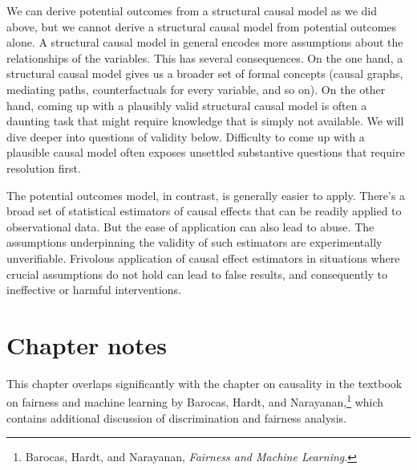 \documentclass{tufte-book}
\begin{document}
We can derive potential outcomes from a structural causal model as we
did above, but we cannot derive a structural causal model from potential
outcomes alone. A structural causal model in general encodes more
assumptions about the relationships of the variables. This has several
consequences. On the one hand, a structural causal model gives us a
broader set of formal concepts (causal graphs, mediating paths,
counterfactuals for every variable, and so on). On the other hand,
coming up with a plausibly valid structural causal model is often a
daunting task that might require knowledge that is simply not available.
We will dive deeper into questions of validity below. Difficulty to come
up with a plausible causal model often exposes unsettled substantive
questions that require resolution first.

The potential outcomes model, in contrast, is generally easier to apply.
There's a broad set of statistical estimators of causal effects that can
be readily applied to observational data. But the ease of application
can also lead to abuse. The assumptions underpinning the validity of
such estimators are experimentally unverifiable. Frivolous application
of causal effect estimators in situations where crucial assumptions do
not hold can lead to false results, and consequently to ineffective or
harmful interventions.

\hypertarget{chapter-notes-8}{%
\section{Chapter notes}\label{chapter-notes-8}}

This chapter overlaps significantly with the chapter on causality in the
textbook on fairness and machine learning by Barocas, Hardt, and
Narayanan,\footnote{Barocas, Hardt, and Narayanan, \emph{Fairness and
  Machine Learning}.} which contains additional discussion of
discrimination and fairness analysis.
\end{document}
